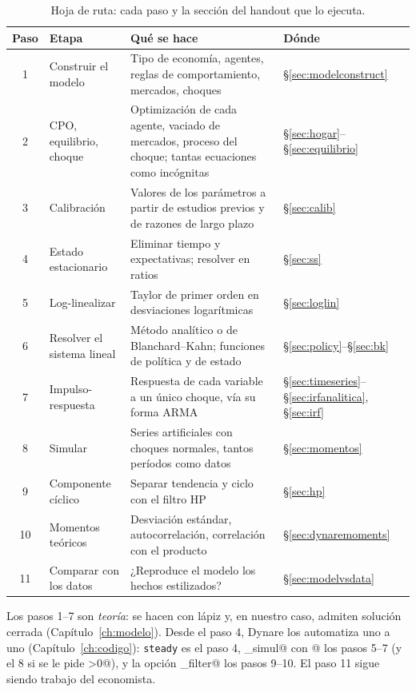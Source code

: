 \documentclass[11pt,a4paper]{report}
\newcounter{tcbrem}[section]
\renewcommand{\thetcbrem}{\thesection.\arabic{tcbrem}}
\newenvironment{remark}{%
  \refstepcounter{tcbrem}%
  \begin{tcolorbox}[remarkstyle, title={Observación~\thetcbrem}]}%
{\end{tcolorbox}}
\newcommand{\code}[1]{\texttt{#1}}
\begin{document}
\begin{table}[H]
\centering\small
\begin{tabular}{clp{6.3cm}l}
\toprule
\textbf{Paso} & \textbf{Etapa} & \textbf{Qué se hace} & \textbf{Dónde}\\
\midrule
1  & Construir el modelo & Tipo de economía, agentes, reglas de comportamiento, mercados, choques & \S\ref{sec:modelconstruct}\\
2  & CPO, equilibrio, choque & Optimización de cada agente, vaciado de mercados, proceso del choque; tantas ecuaciones como incógnitas & \S\ref{sec:hogar}--\S\ref{sec:equilibrio}\\
3  & Calibración & Valores de los parámetros a partir de estudios previos y de razones de largo plazo & \S\ref{sec:calib}\\
4  & Estado estacionario & Eliminar tiempo y expectativas; resolver en ratios & \S\ref{sec:ss}\\
5  & Log-linealizar & Taylor de primer orden en desviaciones logarítmicas & \S\ref{sec:loglin}\\
6  & Resolver el sistema lineal & Método analítico o de Blanchard--Kahn; funciones de política y de estado & \S\ref{sec:policy}--\S\ref{sec:bk}\\
7  & Impulso-respuesta & Respuesta de cada variable a un único choque, vía su forma ARMA & \S\ref{sec:timeseries}--\S\ref{sec:irfanalitica}, \S\ref{sec:irf}\\
8  & Simular & Series artificiales con choques normales, tantos períodos como datos & \S\ref{sec:momentos}\\
9  & Componente cíclico & Separar tendencia y ciclo con el filtro HP & \S\ref{sec:hp}\\
10 & Momentos teóricos & Desviación estándar, autocorrelación, correlación con el producto & \S\ref{sec:dynaremoments}\\
11 & Comparar con los datos & ¿Reproduce el modelo los hechos estilizados? & \S\ref{sec:modelvsdata}\\
\bottomrule
\end{tabular}
\caption{Hoja de ruta: cada paso y la sección del handout que lo ejecuta.}
\label{tab:pasos}
\end{table}

\begin{remark}
Los pasos 1--7 son \emph{teoría}: se hacen con lápiz y, en nuestro caso, admiten
solución cerrada (Capítulo~\ref{ch:modelo}). Desde el paso 4, Dynare los automatiza
uno a uno (Capítulo~\ref{ch:codigo}): \code{steady} es el paso 4,
\lstinline@stoch_simul@ con @ los pasos 5--7 (y el 8 si se le pide \lstinline@periods>0@), y la opción
\lstinline@hp_filter@ los pasos 9--10. El paso 11 sigue siendo trabajo del economista.
\end{remark}
\end{document}
